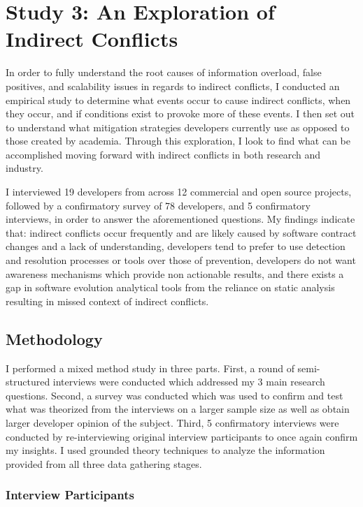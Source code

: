 \section{Study 3: An Exploration of Indirect Conflicts}
\label{study:exploration}

In order to fully understand the root causes of information overload, false positives, and
scalability issues in regards to indirect conflicts, I conducted an empirical study to determine what events occur to
cause indirect conflicts, when they occur, and if conditions exist to provoke more of these events. 
I then set out to understand what mitigation strategies developers currently use as opposed to those created
by academia. Through this exploration, I look to find what can be accomplished moving forward with indirect conflicts
in both research and industry.

I interviewed 19 developers from across 12 commercial and open source projects, followed by a confirmatory survey of 78 
developers, and 5 confirmatory interviews, in order to answer the aforementioned questions. My findings indicate that: 
indirect conflicts occur frequently and are likely caused by software contract changes and a lack of understanding,
developers tend to prefer to use detection and resolution processes or tools
over those of prevention, developers do not want awareness mechanisms which provide non actionable results, 
and there exists a gap in software evolution analytical tools from the reliance on static analysis resulting in missed
context of indirect conflicts.

\subsection{Methodology}
\label{sec:exp-meth}

I performed a mixed method study in three parts. First, a round of semi-structured interviews were conducted which 
addressed my 3 main research questions. Second, a survey was conducted
which was used to confirm and test what was theorized from the interviews on a larger sample size as well as obtain
larger developer opinion of the subject. Third, 5 confirmatory interviews were conducted by re-interviewing original
interview participants to once again confirm my insights.
I used grounded theory techniques to analyze the information provided from all three data gathering stages.

\subsubsection{Interview Participants}

